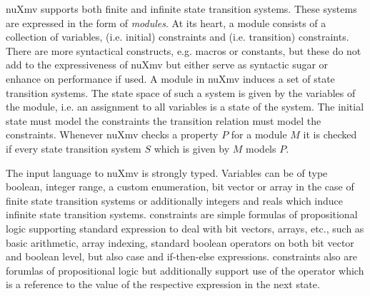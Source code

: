 nuXmv supports both finite and infinite state transition systems.
These systems are expressed in the form of \textit{modules}.
At its heart, a module consists of a collection of variables,  (i.e. initial) constraints and  (i.e. transition) constraints.
There are more syntactical constructs, e.g. macros or constants, but these do not add to the expressiveness of nuXmv but either serve as syntactic sugar or enhance on performance if used.
A module in nuXmv induces a set of state transition systems.
The state space of such a system is given by the variables of the module, i.e. an assignment to all variables is a state of the system.
The initial state must model the  constraints the transition relation must model the  constraints.
Whenever nuXmv checks a property $ P $ for a module $ M $ it is checked if every state transition system $ S $ which is given by $ M $ models $ P $.

The input language to nuXmv is strongly typed.
Variables can be of type boolean, integer range, a custom enumeration, bit vector or array in the case of finite state transition systems or additionally integers and reals which induce infinite state transition systems.
 constraints are simple formulas of propositional logic supporting standard expression to deal with bit vectors, arrays, etc., such as basic arithmetic, array indexing, standard boolean operators on both bit vector and boolean level, but also case and if-then-else expressions.
 constraints also are forumlas of propositional logic but additionally support use of the  operator which is a reference to the value of the respective expression in the next state.

